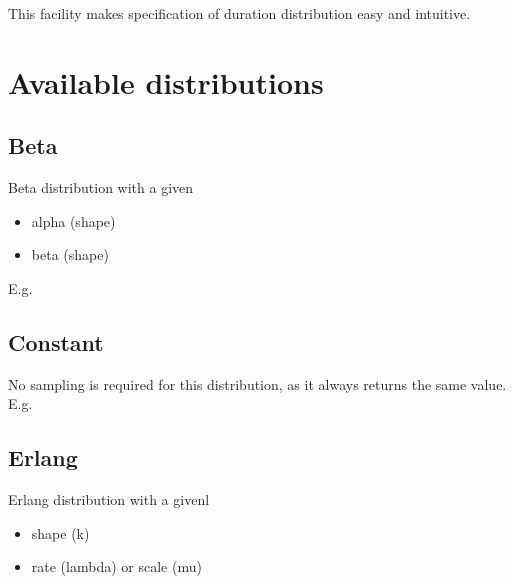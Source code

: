 \documentclass[letterpaper,10pt,english]{sphinxmanual}
\begin{document}
This facility makes specification of duration distribution easy and intuitive.


\section{Available distributions}
\label{\detokenize{Distributions:available-distributions}}

\subsection{Beta}
\label{\detokenize{Distributions:beta}}
Beta distribution with a given
\begin{itemize}
\item {} 
alpha (shape)

\item {} 
beta (shape)

\end{itemize}

E.g.

\begin{sphinxVerbatim}[commandchars=\\\{\}]
    
\end{sphinxVerbatim}


\subsection{Constant}
\label{\detokenize{Distributions:constant}}
No sampling is required for this distribution, as it always returns the same value. E.g.

\begin{sphinxVerbatim}[commandchars=\\\{\}]
  
\end{sphinxVerbatim}


\subsection{Erlang}
\label{\detokenize{Distributions:erlang}}
Erlang distribution with a givenl
\begin{itemize}
\item {} 
shape (k)

\item {} 
rate (lambda) or scale (mu)

\end{itemize}
\end{document}
